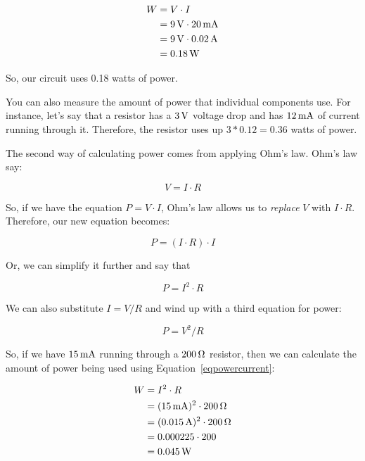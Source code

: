 \begin{align*}
W &= V\cdot I \\
  &= 9\,\si{\volt}\cdot 20\,\si{\milli\ampere}  \\
  &= 9\,\si{\volt}\cdot 0.02\,\si{\ampere} \\
  &= 0.18\,\si{\watt}
\end{align*}

So, our circuit uses 0.18 watts of power.

You can also measure the amount of power that individual components use.
For instance, let's say that a resistor has a $3\,\si{\volt}$ voltage drop and has $12\,\si{\milli\ampere}$ of current running through it.
Therefore, the resistor uses up $3 * 0.12 = 0.36$ watts of power.

The second way of calculating power comes from applying Ohm's law.
Ohm's law say:

\begin{equation}
V = I\cdot R
\end{equation}

So, if we have the equation $P = V\cdot I$, Ohm's law allows us to \emph{replace} $V$ with $I\cdot R$.
Therefore, our new equation becomes:

\begin{equation}
P = (I\cdot R)\cdot I
\end{equation}

Or, we can simplify it further and say that

\begin{equation}
\label{eqpowercurrent}
P = I^2\cdot R
\end{equation}

We can also substitute $I = V / R$ and wind up with a third equation for power:

\begin{equation}
P = V^2 / R
\end{equation}

So, if we have $15\,\si{\milli\ampere}$ running through a $200\,\si{\ohm}$ resistor, then we can calculate the amount of power being used using Equation~\ref{eqpowercurrent}:

\begin{align*}
W &= I^2\cdot R \\
  &= (15\,\si{\milli\ampere})^2\cdot 200\,\si{\ohm} \\
  &= (0.015\,\si{\ampere})^2\cdot 200\,\si{\ohm} \\
  &= 0.000225\cdot 200 \\
  &= 0.045\,\si{\watt}
\end{align*}

